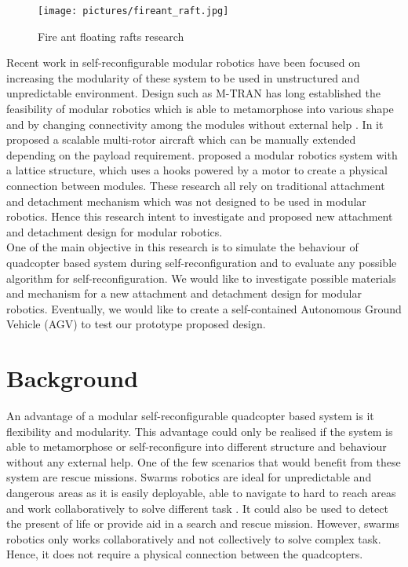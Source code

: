 \documentclass[12pt,A4]{article}
\begin{document}
	\begin{figure}[h!]
		\centering
		\texttt{[image: pictures/fireant\_raft.jpg]}
		\caption{Fire ant floating rafts research}
	\end{figure}
	
	Recent work in self-reconfigurable modular robotics have been focused on increasing the modularity of these system to be used in unstructured and unpredictable environment. Design such as M-TRAN has long established the feasibility of modular robotics which is able to metamorphose into various shape and by changing connectivity among the modules without external help \citep{murata2002m-tran}. In \citep{duffy2015lift} it proposed a scalable multi-rotor aircraft which can be manually extended depending on the payload requirement. \citep{jorgensen2004modular} proposed a  modular robotics system with a lattice structure, which uses a hooks powered by a motor to create a physical connection between modules. These research all rely on traditional attachment and detachment mechanism which was not designed to be used in modular robotics. Hence this research intent to investigate and proposed new attachment and detachment design for modular robotics.\\
	
	One of the main objective in this research is to simulate the behaviour of quadcopter based system during self-reconfiguration and to evaluate any possible algorithm for self-reconfiguration. We would like to investigate possible materials and mechanism for a new attachment and detachment design for modular robotics. Eventually, we would like to create a self-contained Autonomous Ground Vehicle (AGV) to test our prototype proposed design.\\

	\section{Background}
	
	An advantage of a modular self-reconfigurable quadcopter based system is it flexibility and modularity. This advantage could only be realised if the system is able to metamorphose or self-reconfigure into different structure and behaviour without any external help. One of the few scenarios that would benefit from these system are rescue missions. Swarms robotics are ideal for unpredictable and dangerous areas as it is easily deployable, able to navigate to hard to reach areas and work collaboratively to solve different task \citep{stormont2005autonomous}. It could also be used to detect the present of life or provide aid in a search and rescue mission. However, swarms robotics only works collaboratively and not collectively to solve complex task. Hence, it does not require a physical connection between the quadcopters.\\
	
\end{document}
